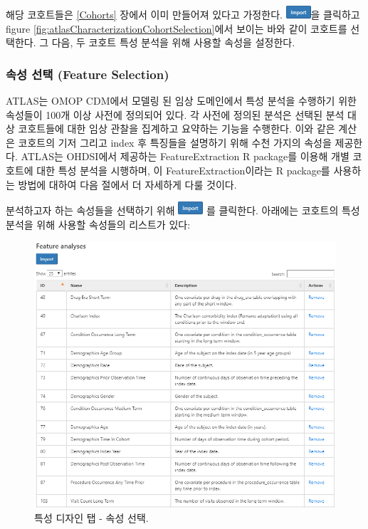 \documentclass[11pt]{book}
\theoremstyle{definition}
\theoremstyle{definition}
\theoremstyle{definition}
\theoremstyle{remark}
\begin{document}
해당 코호트들은 \ref{Cohorts} 장에서 이미 만들어져 있다고 가정한다.
\includegraphics{images/Characterization/atlasImportButton.png}을
클릭하고 figure \ref{fig:atlasCharacterizationCohortSelection}에서
보이는 바와 같이 코호트를 선택한다. 그 다음, 두 코호트 특성 분석을 위해
사용할 속성을 설정한다.

\subsubsection*{속성 선택 (Feature
Selection)}\label{--feature-selection}

ATLAS는 OMOP CDM에서 모델링 된 임상 도메인에서 특성 분석을 수행하기 위한
속성들이 100개 이상 사전에 정의되어 있다. 각 사전에 정의된 분석은 선택된
분석 대상 코호트들에 대한 임상 관찰을 집계하고 요약하는 기능을 수행한다.
이와 같은 계산은 코호트의 기저 그리고 index 후 특징들을 설명하기 위해
수천 가지의 속성을 제공한다. ATLAS는 OHDSI에서 제공하는
FeatureExtraction R package를 이용해 개별 코호트에 대한 특성 분석을
시행하며, 이 FeatureExtraction이라는 R package를 사용하는 방법에 대하여
다음 절에서 더 자세하게 다룰 것이다. 

분석하고자 하는 속성들을 선택하기 위해
\includegraphics{images/Characterization/atlasImportButton.png} 를
클릭한다. 아래에는 코호트의 특성 분석을 위해 사용할 속성들의 리스트가
있다:

\begin{figure}

{\centering \includegraphics[width=1\linewidth]{images/Characterization/atlasCharacterizationFeatureSelection} 

}

\caption{특성 디자인 탭 - 속성 선택.}\label{fig:atlasCharacterizationFeatureSelection}
\end{figure}
\end{document}

